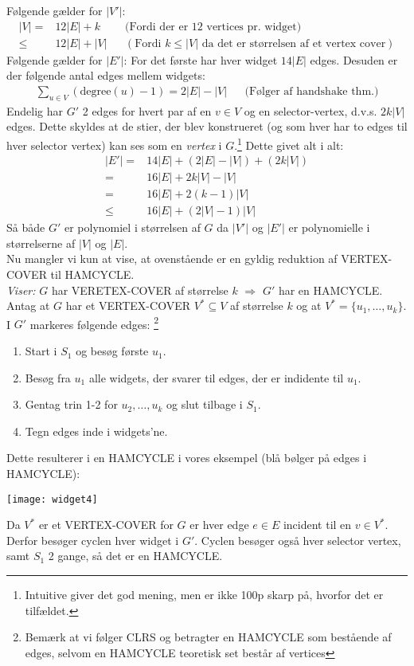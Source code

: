 Følgende gælder for $|V'|$:
\begin{align*}
|V| =& 12|E| + k && \text{(Fordi der er 12 vertices pr. widget)} \\
\le& 12|E| + |V|  && (\text{Fordi } k \le |V| \text{ da det er størrelsen af et vertex cover})
\end{align*}
Følgende gælder for $|E'|$: For det første har hver widget $14|E|$ edges. Desuden er der følgende antal edges mellem widgets:
\begin{align*}	
\sum_{u \in V} (\text{degree}(u)-1) = 2|E|-|V| && \text{(Følger af handshake thm.)} 
\end{align*}
Endelig har $G'$ 2 edges for hvert par af en $v \in V$ og en selector-vertex, d.v.s. $2k|V|$ edges. Dette skyldes at de stier, der blev konstrueret (og som hver har to edges til hver selector vertex) kan ses som en \textit{vertex} i $G$.\footnote{Intuitive giver det god mening, men er ikke 100p skarp på, hvorfor det er tilfældet.} Dette givet alt i alt: 
\begin{align*}
|E'| =& 14|E|+(2|E|-|V|)+(2k|V|) \\
=& 16|E|+2k|V|-|V| \\
=& 16|E|+2(k-1)|V| \\
\le& 16|E|+(2|V|-1)|V| 
\end{align*}
Så både $G'$ er polynomiel i størrelsen af $G$ da $|V'|$ og $|E'|$ er polynomielle i størrelserne af $|V|$ og $|E|$. \\

Nu mangler vi kun at vise, at ovenstående er en gyldig reduktion af VERTEX-COVER til HAMCYCLE. \\

\textit{Viser:} $G$ har VERETEX-COVER af størrelse $k$ $\Longrightarrow$ $G'$ har en HAMCYCLE. \\

Antag at $G$ har et VERTEX-COVER $V^* \subseteq V$ af størrelse $k$ og at $V^*=\{u_1,\ldots,u_k\}$. I $G'$ markeres følgende edges: \footnote{Bemærk at vi følger CLRS og betragter en HAMCYCLE som bestående af edges, selvom en HAMCYCLE teoretisk set består af vertices}
\begin{enumerate}
	\item Start i $S_1$ og besøg første $u_1$. 
	\item Besøg fra $u_1$ alle widgets, der svarer til edges, der er indidente til $u_1$. 
	\item Gentag trin 1-2 for $u_2,\ldots,u_k$ og slut tilbage i $S_1$. 
	\item Tegn edges inde i widgets'ne.  
\end{enumerate} 
Dette resulterer i en HAMCYCLE i vores eksempel (blå bølger på edges i HAMCYCLE):
\begin{center}
	\texttt{[image: widget4]}
\end{center}
Da $V^*$ er et VERTEX-COVER for $G$ er hver edge $e \in E$ incident til en $v \in V^*$. Derfor besøger cyclen hver widget i $G'$. Cyclen besøger også hver selector vertex, samt $S_1$ 2 gange, så det er en HAMCYCLE. \\


